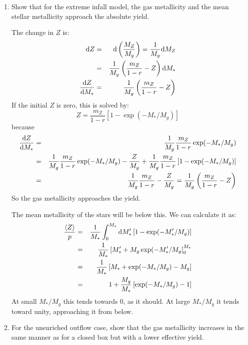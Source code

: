 \begin{enumerate}
\item Show that for the extreme infall model, the gas metallicity and
the mean stellar metallicity approach the absolute yield.

\begin{answer}
The change in $Z$ is:
\begin{eqnarray}
  {\rm d}Z &=& {\rm d}\left(\frac{M_Z}{M_g}\right) =
  \frac{1}{M_g} {\rm d}M_Z \cr
  &=& \frac{1}{M_g} \left(\frac{m_Z}{1-r} - Z\right) {\rm d}M_\ast \cr
  \frac{{\rm d}Z}{{\rm d}M_\ast} &=&
  \frac{1}{M_g} \left(\frac{m_Z}{1-r} - Z\right) 
\end{eqnarray}
If the initial $Z$ is zero, this is solved by:
\begin{equation}
Z = \frac{m_Z}{1-r} \left[1 - \exp(-M_\ast/ M_g)\right]
\end{equation}
because
\begin{eqnarray}
  \frac{{\rm d}Z}{{\rm d}M_\ast} &=&
  \frac{1}{M_g} \frac{m_Z}{1-r} \exp(-M_\ast/ M_g) \cr
  &=&
  \frac{1}{M_g} \frac{m_Z}{1-r} \exp(-M_\ast/ M_g) - \frac{Z}{M_g} +
  \frac{1}{M_g} \frac{m_Z}{1-r} \left[1 - \exp(-M_\ast/ M_g)\right]\cr
  &=&
  \frac{1}{M_g} \frac{m_Z}{1-r} 
  - \frac{Z}{M_g} = \frac{1}{M_g} \left(\frac{m_Z}{1-r} - Z\right) 
\end{eqnarray}
So the gas metallicity approaches the yield.

The mean metallicity of the stars will be below this. We can calculate
it as:
\begin{eqnarray}
  \frac{\langle Z\rangle}{p} &=& \frac{1}{M_\ast} \int_0^{M_\ast}
       {\rm d}M_\ast' \left[ 1 - \exp(-M_\ast' / M_g) \right] \cr
       &=& \frac{1}{M_\ast} \left[M_\ast' + M_g
         \exp(-M_\ast'/M_g\right]_0^{M_\ast} \cr
       &=& \frac{1}{M_\ast} \left[ M_\ast + \exp(-M_\ast/M_g) -
         M_g\right] \cr
       &=& 1 + \frac{M_g}{M_\ast} \left[\exp(-M_\ast/M_g) - 1\right]
\end{eqnarray}
At small $M_\ast/M_g$ this tends towards 0, as it should. At large
$M_\ast/M_g$ it tends toward unity, approaching it from below.
\end{answer}

\item For the unenriched outflow case, show that the gas metallicity
increases in the same manner as for a closed box but with a lower
effective yield.


\end{enumerate}
